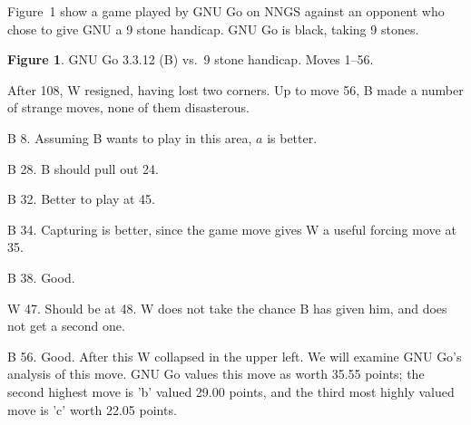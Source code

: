 Figure~1 show a game played by GNU Go on NNGS against an opponent who chose to
give GNU a 9 stone handicap. GNU Go is black, taking 9 stones.

\bigbreak
\centerline{\hglue-20pt}
\medbreak
\centerline{{\bf Figure 1}. GNU Go 3.3.12 (B) vs.\ 9 stone handicap. Moves 1--56.}

\smallskip
After 108, W resigned, having lost two corners. Up to
move 56, B made a number of strange moves, none of them
disasterous.

\smallskip\noindent
B 8. Assuming B wants to play in this area, $a$ is better.

\smallskip\noindent
B 28. B should pull out 24.

\smallskip\noindent
B 32. Better to play at 45.

\smallskip\noindent
B 34. Capturing is better, since the game move gives W a useful
forcing move at 35.

\smallskip\noindent
B 38. Good.

\smallskip\noindent
W 47. Should be at 48. W does not take the chance B has
given him, and does not get a second one.

\smallskip\noindent
B 56. Good. After this W collapsed in the upper left. We
will examine GNU Go's analysis of this move. GNU Go
values this move as worth 35.55 points; the second
highest move is 'b' valued 29.00 points, and the
third most highly valued move is 'c' worth 22.05 points.

% 

